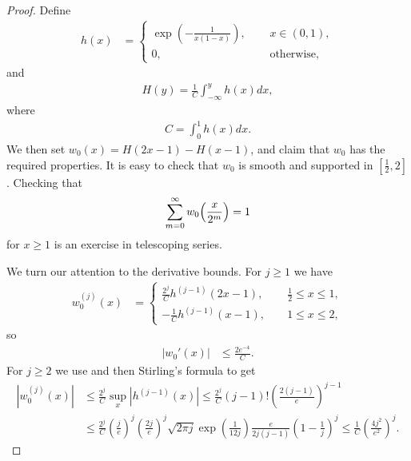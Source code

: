 \documentclass[12pt]{amsart}
\theoremstyle{plain}
\theoremstyle{definition}
\theoremstyle{remark}
\begin{document}
\begin{proof}
Define 
\begin{align*}
h(x) &=
\begin{cases}
\exp\left(-\frac{1}{x(1-x)}\right), \ \ \ \ \ \ &x \in (0,1), \\
0, &\text{otherwise},
\end{cases}
\end{align*}
and
\begin{align*}
H(y) = \frac{1}{C}\int_{-\infty}^y h(x)dx,
\end{align*}
where
\begin{align*}
C = \int_0^1 h(x) dx.
\end{align*}
We then set $w_0(x) = H(2x-1) - H(x-1)$, and claim that $w_0$ has the required properties. It is easy to check that $w_0$ is smooth and supported in $[\frac{1}{2},2]$. Checking that
\begin{align*}
\sum_{m=0}^\infty w_0\Bigl(\frac{x}{2^m} \Bigr)=1
\end{align*}
for $x\geq 1$ is an exercise in telescoping series.

We turn our attention to the derivative bounds. For $j\geq 1$ we have
\begin{align*}
w_0^{(j)}(x) &=
\begin{cases}
\frac{2^j}{C}h^{(j-1)}(2x-1),  \ \ \ \ \ \ &\frac{1}{2}\leq x \leq 1, \\
-\frac{1}{C}h^{(j-1)}(x-1), &1 \leq x \leq 2,
\end{cases}
\end{align*}
so
\begin{align*}
|w_0'(x)| &\leq \frac{2 e^{-4}}{C}.
\end{align*}
For $j\geq 2$ we use \cite[Corollary A.2]{Iwa2014} and then Stirling's formula \cite{Her1955} to get
\begin{align*}
|w_0^{(j)}(x)| &\leq \frac{2^j}{C}\sup_x |h^{(j-1)}(x)| \leq \frac{2^j}{C}(j-1)!\left(\frac{2(j-1)}{e} \right)^{j-1} \\
&\leq \frac{2^j}{C}\left(\frac{j}{e} \right)^j\left(\frac{2j}{e} \right)^j \sqrt{2\pi j}\exp \left( \frac{1}{12j}\right) \frac{e}{2j(j-1)} \left(1 - \frac{1}{j}\right)^j \leq \frac{1}{C}\left( \frac{4j^2}{e^2}\right)^j.
\end{align*}


\end{proof}
\end{document}
